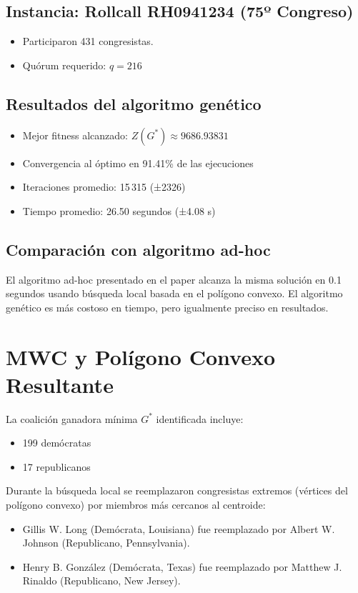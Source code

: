 \documentclass[12pt]{article}
\begin{document}
\subsection*{Instancia: Rollcall RH0941234 (75º Congreso)}
\begin{itemize}
    \item Participaron 431 congresistas.
    \item Quórum requerido: $q = 216$
\end{itemize}

\subsection*{Resultados del algoritmo genético}
\begin{itemize}
    \item Mejor fitness alcanzado: $Z(G^*) \approx 9686.93831$
    \item Convergencia al óptimo en 91.41\% de las ejecuciones
    \item Iteraciones promedio: 15\,315 (±2326)
    \item Tiempo promedio: 26.50 segundos (±4.08 s)
\end{itemize}

\subsection*{Comparación con algoritmo ad-hoc}
El algoritmo ad-hoc presentado en el paper alcanza la misma solución en 0.1 segundos usando búsqueda local basada en el polígono convexo. El algoritmo genético es más costoso en tiempo, pero igualmente preciso en resultados.

\section{MWC y Polígono Convexo Resultante}

La coalición ganadora mínima $G^*$ identificada incluye:
\begin{itemize}
    \item 199 demócratas
    \item 17 republicanos
\end{itemize}

Durante la búsqueda local se reemplazaron congresistas extremos (vértices del polígono convexo) por miembros más cercanos al centroide:
\begin{itemize}
    \item Gillis W. Long (Demócrata, Louisiana) fue reemplazado por Albert W. Johnson (Republicano, Pennsylvania).
    \item Henry B. González (Demócrata, Texas) fue reemplazado por Matthew J. Rinaldo (Republicano, New Jersey).
\end{itemize}
\end{document}
